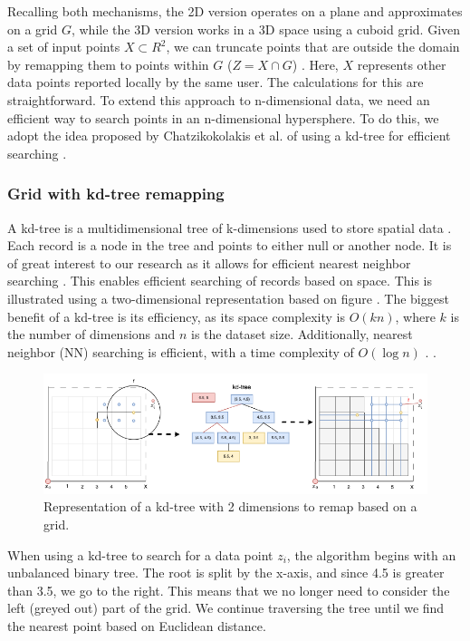 Recalling both mechanisms, the 2D version operates on a plane and approximates on a grid $G$, while the 3D version works in a 3D space using a cuboid grid.
Given a set of input points $X \subset R^2$, we can truncate points that are outside the domain by remapping them to points within $G$ ($Z = X \cap G$) \citep{DBLP:journals/corr/abs-1212-1984}.
Here, $X$ represents other data points reported locally by the same user.
The calculations for this are straightforward. 
To extend this approach to n-dimensional data, we need an efficient way to search points in an n-dimensional hypersphere.
To do this, we adopt the idea proposed by Chatzikokolakis et al. of using a kd-tree for efficient searching \citep{chatzikokolakis_practical_nodate}.
\subsubsection{Grid with kd-tree remapping}
A kd-tree is a multidimensional tree of k-dimensions used to store spatial data \citep{bentley_multidimensional_1975}.
Each record is a node in the tree and points to either null or another node.
It is of great interest to our research as it allows for efficient nearest neighbor searching \citep{washington_k-d_2002}.
This enables efficient searching of records based on space. This is illustrated using a two-dimensional representation based on figure .
The biggest benefit of a kd-tree is its efficiency, as its space complexity is $O(kn)$, where $k$ is the number of dimensions and $n$ is the dataset size.
Additionally, nearest neighbor (NN) searching is efficient, with a time complexity of $O(\log n)$ \citep{washington_k-d_2002}. .
\begin{figure}[H]
  \includegraphics[width=1\textwidth]{TheorethicalFramework/ND-Laplace/Images/KD-tree.png}
  \caption{Representation of a kd-tree with 2 dimensions to remap based on a grid.}
  \label{fig:kd-tree}
\end{figure}
When using a kd-tree to search for a data point $z_i$, the algorithm begins with an unbalanced binary tree.
The root is split by the x-axis, and since 4.5 is greater than 3.5, we go to the right.
This means that we no longer need to consider the left (greyed out) part of the grid.
We continue traversing the tree until we find the nearest point based on Euclidean distance.

